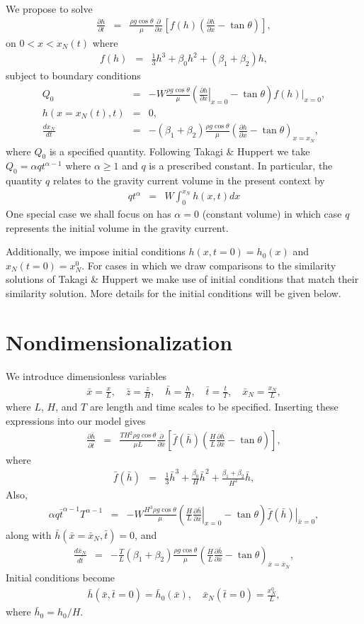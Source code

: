 \documentclass[11pt]{article}
\newcommand{\bea}{\begin{eqnarray}}
\newcommand{\eea}{\end{eqnarray}}
\begin{document}
We propose to solve
\bea
\frac{\partial h}{\partial t} & = & \frac{\rho g \cos \theta}{\mu} \frac{\partial}{\partial x} \left[ f(h) \left( \frac{\partial h}{\partial x} - \tan \theta \right) \right],
\eea
on $0 < x < x_N(t)$ where 
\bea
f(h) & = & \frac{1}{3} h^3 + \beta_0 h^2 + (\beta_1 + \beta_2) h,
\eea
subject to boundary conditions
\bea
Q_0 & = & - W \frac{\rho g \cos \theta}{\mu} \left( \left. \frac{\partial h}{\partial x}\right|_{x=0} - \tan \theta \right) \left. f(h) \right|_{x=0}, \\
h(x=x_N(t) ,t) & = & 0,\\
\frac{dx_N}{dt} & = & -(\beta_1 + \beta_2) \frac{\rho g \cos \theta}{\mu} \left( \frac{\partial h}{\partial x} - \tan \theta \right)_{x=x_N},
\eea
where $Q_0$ is a specified quantity.  Following Takagi \& Huppert \cite{TH2008} we take $Q_0 = \alpha q t^{\alpha -1 }$ where $\alpha \ge 1$ and $q$ is a prescribed constant.
In particular, the quantity $q$ relates to the gravity current volume in the present context by
\bea
q t^{\alpha} & = & W \int_0^{x_N} h(x,t) dx
\eea
One special case we shall focus on has $\alpha=0$ (constant volume) in which case $q$ represents the initial volume in the gravity current.

Additionally, we impose initial conditions $h(x,t=0)=h_0(x)$ and $x_N(t=0) = x_N^0$.  For cases in which we draw comparisons to the similarity solutions of Takagi \& Huppert \cite{TH2008}
we make use of initial conditions that match their similarity solution.  More details for the initial conditions will be given below.



\section{Nondimensionalization}

We introduce dimensionless variables 
\bea
\bar{x} = \frac{x}{L},\quad
\bar{z} = \frac{z}{H},\quad
\bar{h} = \frac{h}{H},\quad
\bar{t} = \frac{t}{T},\quad
\bar{x}_N = \frac{x_N}{L},
\eea
where $L$, $H$, and $T$ are length and time scales to be specified.  Inserting these expressions into our model gives
\bea
\frac{\partial \bar{h}}{\partial \bar{t}} & = & \frac{T H^2 \rho g \cos \theta}{\mu L} \frac{\partial}{\partial \bar{x}} \left[ \bar{f}(\bar{h}) \left( \frac{H}{L} \frac{\partial \bar{h}}{\partial \bar{x}} - \tan \theta \right) \right],
\eea
where
\bea
\bar{f}(\bar{h}) & = & \frac{1}{3} \bar{h}^3 + \frac{\beta_0}{H} \bar{h}^2 + \frac{\beta_1 + \beta_2}{H^2} \bar{h},
\eea
Also,
\bea
\alpha q \bar{t}^{\alpha - 1} T^{\alpha-1} & = &
- W \frac{H^3 \rho g \cos \theta}{\mu} \left( \left. \frac{H}{L} \frac{\partial \bar{h}}{\partial \bar{x}}\right|_{x=0} - \tan \theta \right) \left. \bar{f}(\bar{h}) \right|_{\bar{x}=0}, 
\eea
along with $\bar{h}(\bar{x}=\bar{x}_N, \bar{t}) =0$, and
\bea
\frac{d\bar{x}_N}{d\bar{t}} & = & -\frac{T}{L} (\beta_1 + \beta_2) \frac{\rho g \cos \theta}{\mu} \left( \frac{H}{L} \frac{\partial \bar{h}}{\partial \bar{x}} - \tan \theta \right)_{\bar{x}=\bar{x}_N},
\eea
Initial conditions become
\bea
\bar{h}(\bar{x},\bar{t}=0) = \bar{h}_0(\bar{x}),\quad
\bar{x}_N(\bar{t}=0) = \frac{x_N^0}{L},
\eea
where $\bar{h}_0 = h_0/H$.
\end{document}
